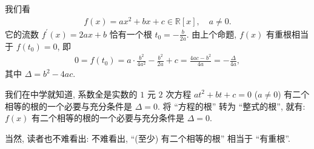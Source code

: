 \begin{example}
    我们看
    \begin{align*}
        f(x) = ax^2 + bx + c \in \mathbb{R}[x], \quad a \neq 0.
    \end{align*}
    它的流数 $f^{\prime} (x) = 2ax + b$ 恰有一个根 $t_0 = -\frac{b}{2a}$. 由上个命题, $f(x)$ 有重根相当于 $f(t_0) = 0$, 即
    \begin{align*}
        0 = f(t_0) = a \cdot \frac{b^2}{4a^2} - \frac{b^2}{2a} + c = \frac{4ac - b^2}{4a} = -\frac{\Delta}{4a},
    \end{align*}
    其中 $\Delta = b^2 - 4ac$.

    我们在中学就知道, 系数全是实数的 $1$ 元 $2$ 次方程 $at^2 + bt + c = 0$ ($a \neq 0$) 有二个相等的根的一个必要与充分条件是 $\Delta = 0$. 将 ``方程的根'' 转为 ``整式的根'', 就有: $f(x)$ 有二个相等的根的一个必要与充分条件是 $\Delta = 0$.

    当然, 读者也不难看出: 不难看出, ``(至少) 有二个相等的根'' 相当于 ``有重根''.
\end{example}
